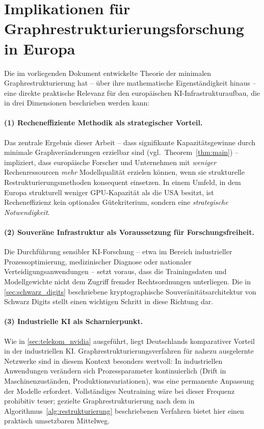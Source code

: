 \documentclass[12pt, a4paper, openany]{report}
\begin{document}
\section{Implikationen für Graphrestrukturierungsforschung in Europa}
\label{sec:implikationen_graphresearch}

Die im vorliegenden Dokument entwickelte Theorie der minimalen
Graphrestrukturierung hat -- über ihre mathematische Eigenständigkeit
hinaus -- eine direkte praktische Relevanz für den europäischen
KI-Infrastrukturaufbau, die in drei Dimensionen beschrieben werden kann:

\paragraph{(1) Recheneffiziente Methodik als strategischer Vorteil.}
Das zentrale Ergebnis dieser Arbeit -- dass signifikante Kapazitätsgewinne
durch minimale Graphveränderungen erzielbar sind (vgl.\
Theorem~\ref{thm:main}) -- impliziert, dass europäische Forscher und
Unternehmen mit \emph{weniger} Rechenressourcen \emph{mehr} Modellqualität
erzielen können, wenn sie strukturelle Restrukturierungsmethoden konsequent
einsetzen. In einem Umfeld, in dem Europa strukturell weniger
GPU-Kapazität als die USA besitzt, ist Recheneffizienz kein optionales
Gütekriterium, sondern eine \emph{strategische Notwendigkeit}.

\paragraph{(2) Souveräne Infrastruktur als Voraussetzung für Forschungsfreiheit.}
Die Durchführung sensibler KI-Forschung -- etwa im Bereich industrieller
Prozessoptimierung, medizinischer Diagnose oder nationaler
Verteidigungsanwendungen -- setzt voraus, dass die Trainingsdaten und
Modellgewichte nicht dem Zugriff fremder Rechtsordnungen unterliegen.
Die in \cref{sec:schwarz_digits} beschriebene kryptographische
Souveränitätsarchitektur von Schwarz Digits stellt einen wichtigen
Schritt in diese Richtung dar.

\paragraph{(3) Industrielle KI als Scharnierpunkt.}
Wie in \cref{sec:telekom_nvidia} ausgeführt, liegt Deutschlands
komparativer Vorteil in der industriellen KI. Graphrestrukturierungsverfahren
für nahezu ausgelernte Netzwerke sind in diesem Kontext besonders wertvoll:
In industriellen Anwendungen verändern sich Prozessparameter kontinuierlich
(Drift in Maschinenzuständen, Produktionsvariationen), was eine
permanente Anpassung der Modelle erfordert. Vollständiges Neutraining wäre
bei dieser Frequenz prohibitiv teuer; gezielte Graphrestrukturierung
nach dem in Algorithmus~\ref{alg:restrukturierung} beschriebenen Verfahren
bietet hier einen praktisch umsetzbaren Mittelweg.
\end{document}
